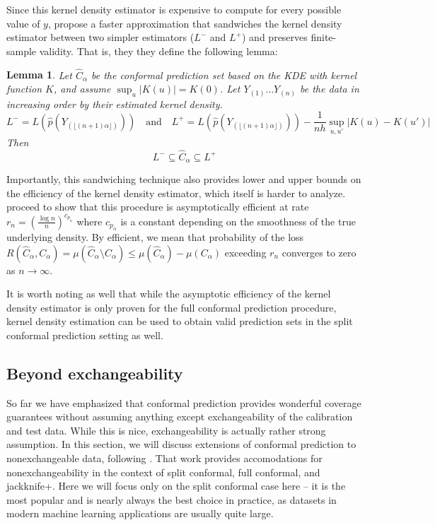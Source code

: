 \documentclass[a4paper, 12pt]{article}
\newtheorem{lemma}{Lemma}
\begin{document}
Since this kernel density estimator is expensive to compute for every possible value of $y$, \citeauthor{leiDistributionFreePrediction2013} propose a faster approximation that sandwiches the kernel density estimator between two simpler estimators ($L^-$ and $L^+$) and preserves finite-sample validity. That is, they they define the following lemma:
\begin{lemma}
    Let $\hat{C}_\alpha$ be the conformal prediction set based on the KDE with kernel function $K$, and assume $\sup_u |K(u)|=K(0)$. Let $Y_{(1)} \ldots Y_{(n)}$ be the data in increasing order by their estimated kernel density.
    \[L^-= L\left(\hat{p}(Y_{(\lfloor (n+1)\alpha \rfloor)})\right) \quad \text{and} \quad
        L^+= L\left(\hat{p}(Y_{(\lfloor (n+1)\alpha \rfloor)})\right) - \frac{1}{nh} \sup_{u, u'} |K(u) - K(u')| \]
    Then
    \[ L^- \subseteq \hat{C}_\alpha \subseteq L^+ \]
\end{lemma}

Importantly, this sandwiching technique also provides lower and upper bounds on the efficiency of the kernel density estimator, which itself is harder to analyze. \textcite{leiDistributionFreePrediction2013} proceed to show that this procedure is asymptotically efficient at rate $r_n=(\frac{\log n}{n})^{c_{p_\alpha}}$ where $c_{p_\alpha}$ is a constant depending on the smoothness of the true underlying density. By efficient, we mean that probability of the loss $R(\hat{C}_\alpha, C_\alpha) = \mu(\hat{C}_\alpha \setminus C_\alpha) \leq \mu(\hat{C}_\alpha) - \mu(C_\alpha)$ exceeding $r_n$ converges to zero as $n \to \infty$.

It is worth noting as well that while the asymptotic efficiency of the kernel density estimator is only proven for the full conformal prediction procedure, kernel density estimation can be used to obtain valid prediction sets in the split conformal prediction setting as well.

\subsection{Beyond exchangeability}
\label{sec:nonexchangeable}
So far we have emphasized that conformal prediction provides wonderful coverage guarantees without assuming anything except exchangeability of the calibration and test data. While this is nice, exchangeability is actually rather strong assumption. In this section, we will discuss extensions of conformal prediction to nonexchangeable data, following \textcite{barberConformalPredictionExchangeability2023}. That work provides accomodations for nonexchangeability in the context of split conformal, full conformal, and jackknife+. Here we will focus only on the split conformal case here -- it is the most popular and is nearly always the best choice in practice, as datasets in modern machine learning applications are usually quite large.
\end{document}

